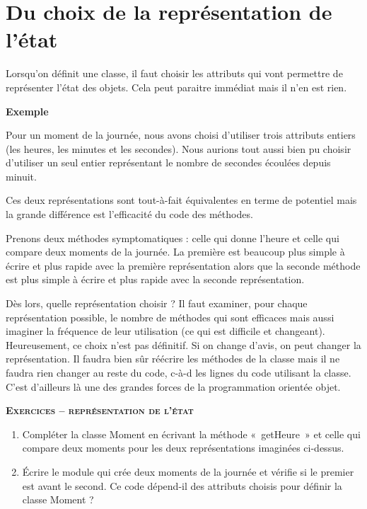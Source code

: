 \section{Du choix de la représentation de l'état}

Lorsqu'on définit une classe, il faut choisir les
attributs qui vont permettre de représenter l'état des
objets. Cela peut paraitre immédiat mais il n'en est
rien.

{\bfseries
Exemple}

Pour un moment de la journée, nous avons choisi
d'utiliser trois attributs entiers (les heures, les
minutes et les secondes). Nous aurions tout aussi bien pu choisir
d'utiliser un seul entier représentant le nombre de
secondes écoulées depuis minuit.

Ces deux représentations sont tout-à-fait équivalentes en terme de
potentiel mais la grande différence est l'efficacité
du code des méthodes. 

Prenons deux méthodes symptomatiques : celle qui donne
l'heure et celle qui compare deux moments de la
journée. La première est beaucoup plus simple à écrire et plus rapide
avec la première représentation alors que la seconde méthode est plus
simple à écrire et plus rapide avec la seconde représentation.

Dès lors, quelle représentation choisir ? Il faut examiner, pour chaque
représentation possible, le nombre de méthodes qui sont efficaces mais
aussi imaginer la fréquence de leur utilisation (ce qui est difficile
et changeant). Heureusement, ce choix n'est pas
définitif. Si on change d'avis, on peut changer la
représentation. Il faudra bien sûr réécrire les méthodes de la classe
mais il ne faudra rien changer au reste du code, c-à-d les lignes du
code utilisant la classe. C’est d’ailleurs là une des grandes forces de
la programmation orientée objet.

{\sffamily\bfseries\scshape
Exercices – représentation de l'état}

\begin{enumerate}
	\item 
		Compléter la classe Moment en écrivant la méthode «~getHeure~» et celle
		qui compare deux moments pour les deux représentations imaginées
		ci-dessus.
	\item 
		Écrire le module qui crée deux moments de la journée et vérifie si le
		premier est avant le second. Ce code dépend-il des attributs choisis
		pour définir la classe Moment ?
\end{enumerate}

